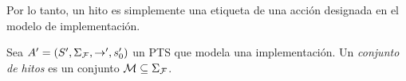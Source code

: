%
%
%
%
Por lo tanto, un hito es simplemente una etiqueta de una acción designada en el modelo de implementación.


\begin{definition}%
  Sea $A' =( S', \Sigma_{\mathcal{F}}, \rightarrow', s_0' )$ un PTS que modela una implementación.
  Un \emph{conjunto de hitos} es un conjunto $\mathcal{M}\subseteq\Sigma_{\mathcal{F}}$.
\end{definition}

